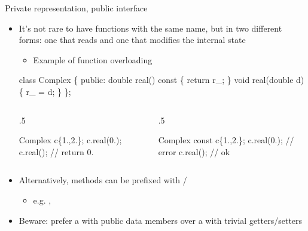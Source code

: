 \begin{frame}[fragile]{Private representation, public interface
    \insertcontinuationtext}

  \begin{itemize}

  \item It's not rare to have functions with the same name, but in two different
    forms: one that reads and one that modifies the internal state
    \begin{itemize}
    \item Example of function overloading
    \end{itemize}

    \begin{codeblock}
class Complex \{
 public:
  double real()         const \{ return r_; \}
  void   real(double d)       \{ r_ = d; \}
  \ddd
\};\end{codeblock}

    \begin{columns}
      \begin{column}{.5\textwidth}
        \begin{codeblock}
Complex c\{1.,2.\};
c.real(0.);
c.real();           // return 0.\end{codeblock}
      \end{column}
      \begin{column}{.5\textwidth}
        \begin{codeblock}
Complex const c\{1.,2.\};
c.real(0.);         // error
c.real();           // ok\end{codeblock}
      \end{column}
    \end{columns}
    
  \item Alternatively, methods can be prefixed with /
    \begin{itemize}
    \item e.g. , 
    \end{itemize}
  \item Beware: prefer a  with public data members over a
         with trivial getters/setters
  \end{itemize}

\end{frame}

